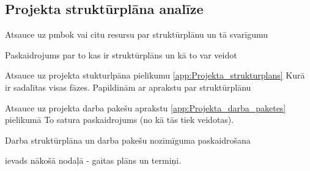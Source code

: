 \subsection{Projekta struktūrplāna analīze}
Atsauce uz pmbok vai citu resursu par struktūrplānu un tā svarīgumu
\par
Paskaidrojums par to kas ir struktūrplāns un kā to var veidot
\par
Atsauce uz projekta stukturlpāna pielikumu \ref{app:Projekta_strukturplans}
Kurā ir sadalītas visas fāzes. Papildinām ar aprakstu par struktūrplānu
\par
Atsauce uz projekta darba pakešu aprakstu \ref{app:Projekta_darba_paketes} pielikumā
To satura paskaidrojums (no kā tās tiek veidotas).
\par
Darba struktūrplāna un darba pakešu nozīmīguma paskaidrošana
\par
ievads nākošā nodaļā - gaitas plāns un termiņi.
